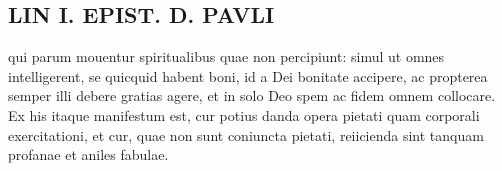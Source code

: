 \documentclass{article}
\begin{document}
\begin{pages}
\section*{LIN I. EPIST. D. PAVLI }
\marginpar{[ p.98 ]}\pstart qui parum mouentur spiritualibus quae non percipiunt: simul ut omnes intelligerent, se quicquid habent boni, id a Dei bonitate accipere, ac propterea semper illi debere gratias agere, et in solo Deo spem ac fidem omnem collocare. Ex his itaque manifestum est, cur potius danda opera pietati quam corporali exercitationi, et cur, quae non sunt coniuncta pietati, reiicienda sint tanquam profanae et aniles fabulae.  \pend
{}
{}

\end{pages}
\end{document}
